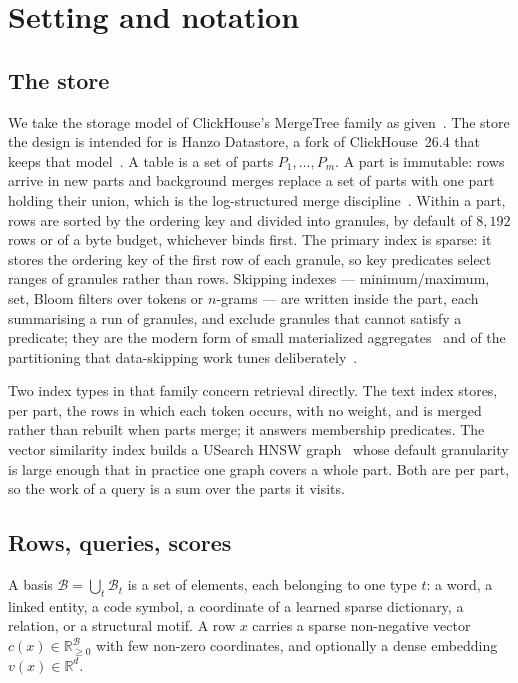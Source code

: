 \section{Setting and notation}
\label{sec:setting}

\subsection{The store}

We take the storage model of ClickHouse's MergeTree family as
given~\cite{schulze2024clickhouse,clickhousedocs}. The store the design is
intended for is Hanzo Datastore, a fork of ClickHouse~26.4 that keeps that
model~\cite{hanzodatastore}. \prior{} A table is a set of
parts $P_1,\dots,P_m$. A part is immutable: rows arrive in new parts and
background merges replace a set of parts with one part holding their union,
which is the log-structured merge discipline~\cite{oneil1996lsm}. Within a
part, rows are sorted by the ordering key and divided into granules, by default
of $8{,}192$ rows or of a byte budget, whichever binds first. The primary index
is sparse: it stores the ordering key of the first row of each granule, so key
predicates select ranges of granules rather than rows. Skipping indexes ---
minimum/maximum, set, Bloom filters over tokens or $n$-grams --- are written
inside the part, each summarising a run of granules, and exclude granules that
cannot satisfy a predicate; they are the modern form of small materialized
aggregates~\cite{moerkotte1998sma} and of the partitioning that data-skipping
work tunes deliberately~\cite{sun2014skipping}.

Two index types in that family concern retrieval directly. The text index
stores, per part, the rows in which each token occurs, with no weight, and is
merged rather than rebuilt when parts merge; it answers membership predicates.
The vector similarity index builds a USearch HNSW graph~\cite{malkov2020hnsw,
usearch} whose default granularity is large enough that in practice one graph
covers a whole part. Both are per part, so the work of a query is a sum over
the parts it visits.

\subsection{Rows, queries, scores}

\begin{definition}
A basis $\mathcal{B} = \bigcup_t \mathcal{B}_t$ is a set of elements, each
belonging to one type $t$: a word, a linked entity, a code symbol, a coordinate
of a learned sparse dictionary, a relation, or a structural motif. A row $x$
carries a sparse non-negative vector $c(x) \in \mathbb{R}_{\ge 0}^{\mathcal{B}}$
with few non-zero coordinates, and optionally a dense embedding
$v(x) \in \mathbb{R}^d$.
\end{definition}

